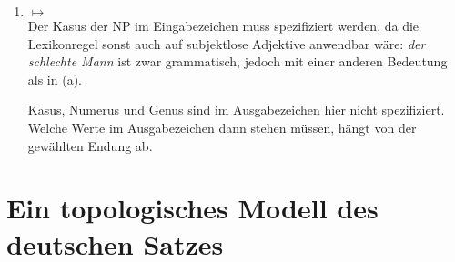 \begin{enumerate}
\item
\ea 
{} $\mapsto$\\
\z
Der Kasus der NP im Eingabezeichen muss spezifiziert werden, da die Lexikonregel sonst auch auf
subjektlose Adjektive anwendbar wäre:
\eal
{}
\zl
\emph{der schlechte Mann} ist zwar grammatisch, jedoch mit einer anderen Bedeutung als in (a).

Kasus, Numerus und Genus sind im Ausgabezeichen hier nicht spezifiziert. Welche Werte im
Ausgabezeichen dann stehen müssen, hängt von der gewählten Endung ab.

\end{enumerate}

\section{Ein topologisches Modell des deutschen Satzes}

